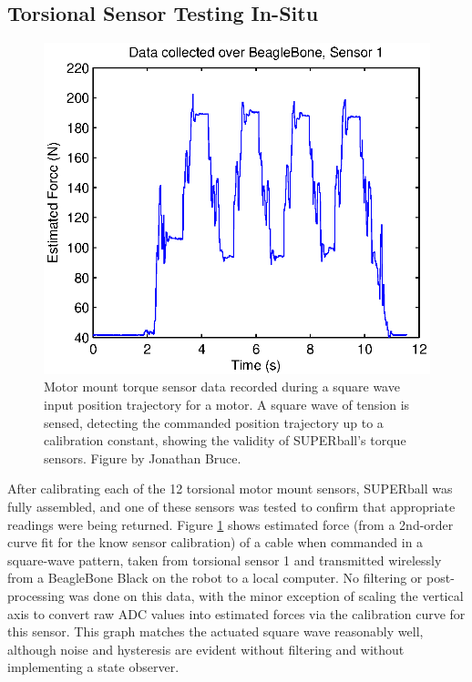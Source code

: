 \documentclass[12pt]{report}
\begin{document}
\subsection{Torsional Sensor Testing In-Situ}

\begin{figure}
      \centering
      \includegraphics[width=0.50\columnwidth]{img/Force_Time_Graph_adjusted.eps}
      \caption{Motor mount torque sensor data recorded during a square wave input position trajectory for a motor. A square wave of tension is sensed, detecting the commanded position trajectory up to a calibration constant, showing the validity of SUPERball's torque sensors. Figure by Jonathan Bruce.~\cite{sabelhaus2015system}}
      \label{fig:sensor1data}
      \vspace{-0.4cm}
\end{figure}

After calibrating each of the 12 torsional motor mount sensors, SUPERball was fully assembled, and one of these sensors was tested to confirm that appropriate readings were being returned.
Figure \ref{fig:sensor1data} shows estimated force (from a 2nd-order curve fit for the know sensor calibration) of a cable when commanded in a square-wave pattern, taken from torsional sensor 1 and transmitted wirelessly from a BeagleBone Black on the robot to a local computer.
No filtering or post-processing was done on this data, with the minor exception of scaling the vertical axis to convert raw ADC values into estimated forces via the calibration curve for this sensor.
This graph matches the actuated square wave reasonably well, although noise and hysteresis are evident without filtering and without implementing a state observer.



\end{document}
